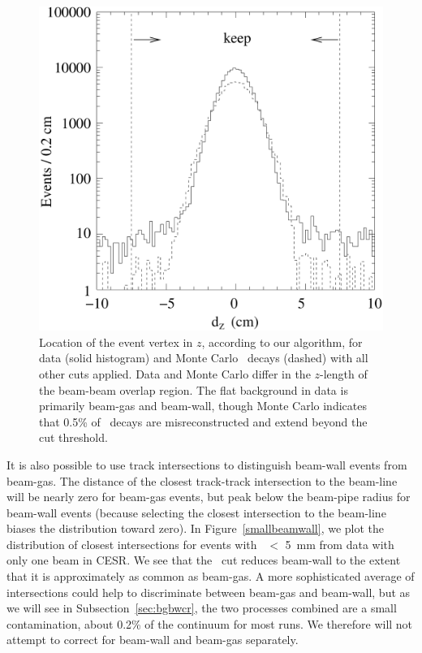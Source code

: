 \documentclass{cornell}
\begin{document}
\begin{figure}[p]
  \begin{center}
    \includegraphics[width=\linewidth]{plots/dz}
  \end{center}
  \caption[Distribution of event vertex $z$ positions]{\label{dz}
  Location of the event vertex in $z$, according to our algorithm, for
  data (solid histogram) and Monte Carlo \ups\ decays (dashed) with
  all other cuts applied.  Data and Monte Carlo differ in the
  $z$-length of the beam-beam overlap region.  The flat background in
  data is primarily beam-gas and beam-wall, though Monte Carlo
  indicates that 0.5\% of \ups\ decays are misreconstructed and extend
  beyond the cut threshold.}
\end{figure}

It is also possible to use track intersections to distinguish
beam-wall events from beam-gas.  The distance of the closest
track-track intersection to the beam-line will be nearly zero for
beam-gas events, but peak below the beam-pipe radius for
beam-wall events (because selecting the closest intersection to the
beam-line biases the distribution toward zero).  In
Figure~\ref{smallbeamwall}, we plot the distribution of closest
intersections for events with \dxy\ $<$ 5~mm from data with only one
beam in CESR.  We see that the \dxy\ cut reduces beam-wall to the
extent that it is approximately as common as beam-gas.  A more
sophisticated average of intersections could help to discriminate
between beam-gas and beam-wall, but as we will see in
Subsection~\ref{sec:bgbwcr}, the two processes combined are a small
contamination, about 0.2\% of the continuum for most runs.  We
therefore will not attempt to correct for beam-wall and beam-gas
separately.
\end{document}
